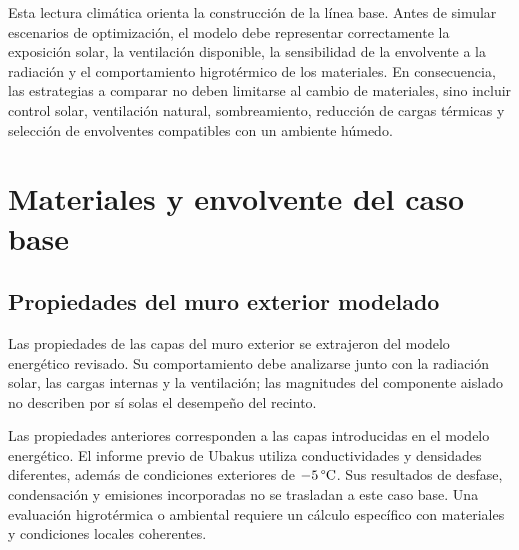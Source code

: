 \begin{textoDosTercios}
Esta lectura climática orienta la construcción de la línea base. Antes de simular escenarios de optimización, el modelo debe representar correctamente la exposición solar, la ventilación disponible, la sensibilidad de la envolvente a la radiación y el comportamiento higrotérmico de los materiales. En consecuencia, las estrategias a comparar no deben limitarse al cambio de materiales, sino incluir control solar, ventilación natural, sombreamiento, reducción de cargas térmicas y selección de envolventes compatibles con un ambiente húmedo.
\end{textoDosTercios}

\par\medskip



\par\medskip

\section{Materiales y envolvente del caso base}

\subsection{Propiedades del muro exterior modelado}

\begin{textoDosTercios}
Las propiedades de las capas del muro exterior se extrajeron del modelo energético revisado. Su comportamiento debe analizarse junto con la radiación solar, las cargas internas y la ventilación; las magnitudes del componente aislado no describen por sí solas el desempeño del recinto.
\end{textoDosTercios}



\begin{textoDosTercios}
Las propiedades anteriores corresponden a las capas introducidas en el modelo energético. El informe previo de Ubakus utiliza conductividades y densidades diferentes, además de condiciones exteriores de $-5\,\text{\textdegree C}$. Sus resultados de desfase, condensación y emisiones incorporadas no se trasladan a este caso base. Una evaluación higrotérmica o ambiental requiere un cálculo específico con materiales y condiciones locales coherentes.
\end{textoDosTercios}

